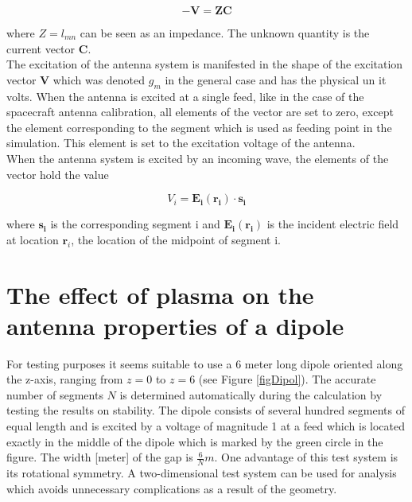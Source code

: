 \documentclass[a4paper,11pt]{thesis}
\begin{document}





\begin{equation}\label{eq:mom}
- \mathbf{V}=\mathbf{ZC}
\end{equation}

where $Z=l_{mn}$ can be seen as an impedance. The unknown quantity is the current vector $\mathbf{C}$. \\

The excitation of the antenna system is manifested in the shape of the excitation vector $\mathbf{V}$ which was denoted $g_m$ in the general case and has the physical un it volts. When the antenna is excited at a single feed, like in the case of the spacecraft antenna calibration, all elements of the vector are set to zero, except the element corresponding to the segment which is used as feeding point in the simulation. This element is set to the excitation voltage of the antenna.\\


When the antenna system is excited by an incoming wave, the elements of the vector hold the value

\begin{equation}
 V_i=\mathbf{E_i(r_i)} \cdot \mathbf{s_i}
\end{equation}

where $\mathbf{s_i}$ is the corresponding segment i and $\mathbf{E_i(r_i)}$ is the incident electric field at location $\mathbf{r}_i$, the location of the midpoint of segment i.


\chapter{The effect of plasma on the antenna properties of a dipole}
For testing purposes it seems suitable to use a 6 meter long dipole oriented along the z-axis, ranging from $z=0$ to $z=6$ (see Figure \ref{figDipol}). The accurate number of segments $N$ is determined automatically during the calculation by testing the results on stability. The dipole consists of several hundred segments of equal length and is excited by a voltage of magnitude 1 at a feed which is located exactly in the middle of the dipole which is marked by the green circle in the figure. The width [meter] of the gap is $\frac{6}{N}m$. One advantage of this test system is its rotational symmetry. A two-dimensional test system can be used for analysis which avoids unnecessary complications as a result of the geometry.
\end{document}
